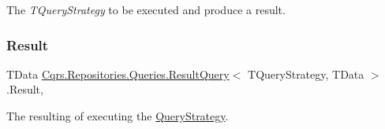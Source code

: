 The {\itshape T\+Query\+Strategy}  to be executed and produce a result. 

\mbox{\label{classCqrs_1_1Repositories_1_1Queries_1_1ResultQuery_a1c9b0137e4b5b1c00c6198fdcfde7ca3_a1c9b0137e4b5b1c00c6198fdcfde7ca3}} 
\subsubsection{\texorpdfstring{Result}{Result}}
{\footnotesize\ttfamily T\+Data \hyperlink{classCqrs_1_1Repositories_1_1Queries_1_1ResultQuery}{Cqrs.\+Repositories.\+Queries.\+Result\+Query}$<$ T\+Query\+Strategy, T\+Data $>$.Result\hspace{0.3cm}{\ttfamily [get]}, {\ttfamily [set]}}



The resulting of executing the \hyperlink{classCqrs_1_1Repositories_1_1Queries_1_1QueryStrategy}{Query\+Strategy}. 

